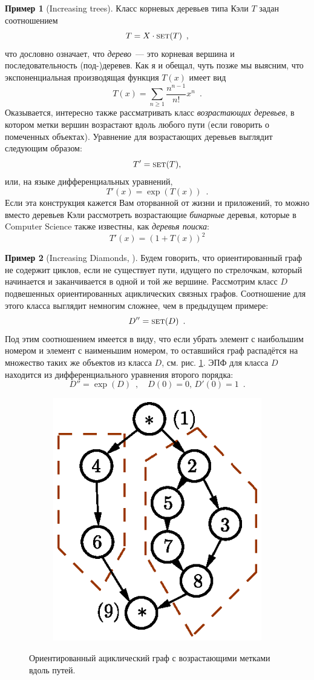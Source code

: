 \documentclass{article}
\theoremstyle{definition}
\newtheorem{example}{Пример}
\begin{document}
\begin{example}[Increasing trees]
    Класс корневых деревьев типа Кэли \( T \) задан соотношением
\[
    T = X \cdot \text{\textsc{set}}(T) \enspace ,
\] 
что дословно означает, что \textit{дерево}~--- это корневая вершина и
последовательность (под-)деревев. Как я и обещал, чуть позже мы выясним, что
экспоненциальная производящая функция \( T(x) \) имеет вид
\[
    T(x) = \sum_{n \geq 1} \dfrac{n^{n-1}}{n!} x^n \enspace .
\]
Оказывается, интересно также рассматривать класс \textit{возрастающих деревьев},
в котором метки вершин возрастают вдоль любого пути (если говорить о помеченных
объектах). Уравнение для возрастающих деревьев выглядит следующим образом:
\[
    T' = \text{\textsc{set}}(T) ,
\]
или, на языке дифференциальных уравнений,
\[
    T'(x) = \exp(T(x)) \enspace .
\]
Если эта конструкция кажется Вам оторванной от жизни и приложений, то можно
вместо деревьев Кэли рассмотреть возрастающие \textit{бинарные} деревья, которые
в Computer Science также известны, как \textit{деревья поиска}:
\[
    T'(x) = (1 + T(x))^2
\]
\end{example}

\begin{example}[Increasing Diamonds, \cite{latin}]
    Будем говорить, что ориентированный граф не содержит циклов, если не
существует пути, идущего по стрелочкам, который начинается и заканчивается в
одной и той же вершине. 
    Рассмотрим класс \( D \) подвешенных ориентированных ациклических связных
графов. Соотношение для этого класса выглядит немногим сложнее, чем в предыдущем
примере:
\[
    D'' = \text{\textsc{set}}(D) \enspace .
\]
Под этим соотношением имеется в виду, что если убрать элемент с наибольшим
номером и элемент с наименьшим номером, то оставшийся граф распадётся на
множество таких же объектов из класса \( D \), см. рис. \ref{fig:dag}. ЭПФ для
класса \( D \) находится из дифференциального уравнения второго порядка:
\[
    D'' = \exp(D) \enspace ,  \quad D(0) = 0, \, D'(0) = 1
\enspace .                                  
\] 
\end{example}
\begin{figure}[h]
\centering
\begin{subfigure}{.8\textwidth}
    \centering
    \includegraphics[width=.4\textwidth]{dag}
\end{subfigure}%
\caption{Ориентированный ациклический граф с возрастающими метками вдоль
путей.}
\label{fig:dag}	
\end{figure}
\end{document}
